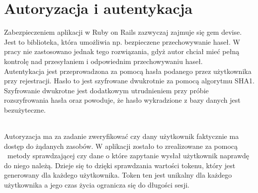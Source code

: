 \section{Autoryzacja i autentykacja}
\label{sec:autoryzacjaAutentykacja}
Zabezpieczeniem aplikacji w Ruby on Rails zazwyczaj zajmuje się gem devise. Jest to biblioteka, która umożliwia np. bezpieczene przechowywanie haseł\cite{rails}. W pracy nie zastosowano jednak tego rozwiązania, gdyż autor chciał mieć pełną  kontrolę nad przesyłaniem i odpowiednim przechowywaniu haseł.\\
Autentykacja jest przeprowadzona za pomocą hasła podanego przez użytkownika przy rejestracji. Hasło to jest szyfrowane dwukrotnie za pomocą algorytmu SHA1. Szyfrowanie dwukrotne jest dodatkowym utrudnieniem przy próbie rozszyfrowania hasła oraz powoduje, że hasło wykradzione z bazy danych jest bezużyteczne.\\
\begin{minipage}{\linewidth}
\label{encryptpassword}
\end{minipage}\\
Autoryzacja ma za zadanie zweryfikować czy dany użytkownik faktycznie ma dostęp do żądanych zasobów. W aplikacji zostało to zrealizowane za pomocą  metody sprawdzającej czy dane o które zapytanie wysłał użytkownik naprawdę do niego należą. Dzieje się to dzięki sprawdzania wartości tokenu, który jest generowany dla każdego użytkownika. Token ten jest unikalny dla każdego użytkownika a jego czas życia ogranicza się do długości sesji. 
\begin{minipage}{\linewidth}
\label{authorization}
\end{minipage}\\
